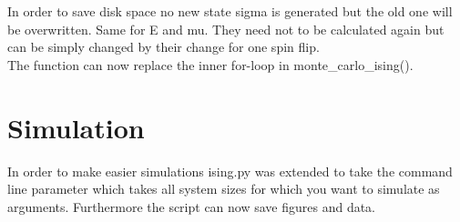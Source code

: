In order to save disk space no new state sigma is generated but the old one will be overwritten.
Same for E and mu.
They need not to be calculated again but can be simply changed by their change for one spin flip.\\

The function can now replace the inner for-loop in monte\_carlo\_ising().\\

\section{Simulation}

In order to make easier simulations ising.py was extended to take the command line parameter  which takes all system sizes for which you want to simulate as arguments.
Furthermore the script can now save figures and data.
